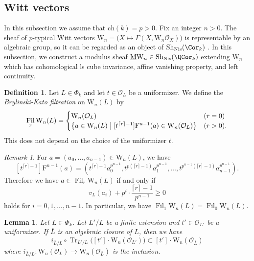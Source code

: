 \documentclass{amsart}
\theoremstyle{plain}
\newtheorem{lemma}[theorem]{Lemma}
\theoremstyle{definition}
\newtheorem{definition}[theorem]{Definition}
\theoremstyle{remark}
\newtheorem{remark}[theorem]{Remark}
\numberwithin{equation}{section}
\DeclareMathOperator{\Sh}{Sh}
\DeclareMathOperator{\Fil}{Fil}
\DeclareMathOperator{\Tr}{Tr}
\def\ceil#1{\lceil #1 \rceil}
\def\Nis{\mathrm{Nis}}
\def\ch{\mathrm{ch}}
\def\MW{\underline{\mathrm{M}}\mathrm{W}}
\begin{document}
\subsection{Witt vectors}
In this subsection we assume that $\ch(k)=p>0$.
Fix an integer $n>0$.
The sheaf of $p$-typical Witt vectors $\mathrm{W}_n=\bigl(X\mapsto \Gamma(X,\mathrm{W}_n\mathcal{O}_X)\bigr)$ is representable by an algebraic group, so it can be regarded as an object of $\Sh_\Nis(\Cor_k)$ \cite[Lemma 1.4.4]{BVK16}.
In this subsection, we construct a modulus sheaf $\MW_n\in \Sh_\Nis(\QCor_k)$ extending $\mathrm{W}_n$ which has cohomological ls cube invariance, affine vanishing property, and left continuity.

\begin{definition}
	Let $L\in \Phi_k$ and let $t\in \mathcal{O}_L$ be a uniformizer.
	We define the \emph{Brylinski-Kato filtration} \cite[Definition 3.1]{Kato89} on $\mathrm{W}_n(L)$ by
	$$
		\Fil_r \mathrm{W}_n(L)=\begin{cases}
			\mathrm{W}_n(\mathcal{O}_L)&(r=0)\\
			\bigl\{a\in \mathrm{W}_n(L)\bigm| [t^{\ceil{r}-1}]\mathrm{F}^{n-1}(a)\in \mathrm{W}_n(\mathcal{O}_L)\bigr\}&(r>0).
		\end{cases}
	$$
	This does not depend on the choice of the uniformizer $t$.
\end{definition}

\begin{remark}\label{Witt_filtration_valuation}
	For $a=(a_0,\dots,a_{n-1})\in \mathrm{W}_n(L)$, we have
	$$
		[t^{\ceil{r}-1}]\mathrm{F}^{n-1}(a)=(t^{\ceil{r}-1}a_0^{p^{n-1}},t^{p(\ceil{r}-1)}a_1^{p^{n-1}},\dots,t^{p^{n-1}(\ceil{r}-1)}a_{n-1}^{p^{n-1}}).
	$$
	Therefore we have $a\in \Fil_r \mathrm{W}_n(L)$ if and only if
	$$
		v_L(a_i) +  p^i\cdot \dfrac{\ceil{r}-1}{p^{n-1}} \geq 0
	$$
	holds for $i=0,1,\dots,n-1$.
	In particular, we have $\Fil_1\mathrm{W}_n(L)=\Fil_0\mathrm{W}_n(L)$.
\end{remark}

\begin{lemma}\label{Witt_trace}
	Let $L\in \Phi_k$.
	Let $L'/L$ be a finite extension and $t'\in \mathcal{O}_{L'}$ be a uniformizer.
	If $\overline{L}$ is an algebraic closure of $L$, then we have
	$$i_{\overline{L}/L}\circ \Tr_{L'/L}\bigl([t']\cdot \mathrm{W}_n(\mathcal{O}_{L'})\bigr)\subset [t']\cdot \mathrm{W}_n(\mathcal{O}_{\overline{L}})$$
	where $i_{\overline{L}/L}\colon \mathrm{W}_n(\mathcal{O}_L)\to \mathrm{W}_n(\mathcal{O}_{\overline{L}})$ is the inclusion.
\end{lemma}
\end{document}
